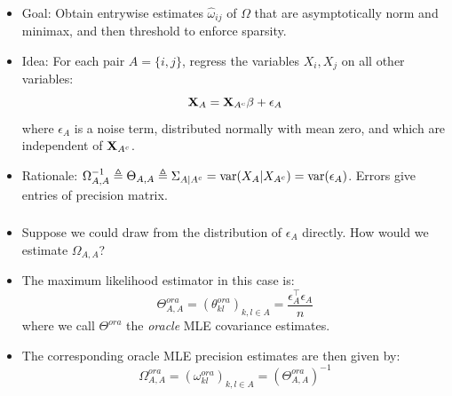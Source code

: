 \begin{frame}[fragile] \frametitle{}
    \begin{itemize}
        \item Goal: Obtain entrywise estimates $\hat\omega_{ij}$ of $\Omega$
            that are asymptotically norm and minimax, and then threshold to
            enforce sparsity.
        \item Idea: For each pair $A = \{i, j\}$, regress the variables $X_i,
            X_j$ on all other variables:
            $$
            \mathbf{X}_A = \mathbf{X}_{A^c}\beta + \epsilon_A
            $$
            where $\epsilon_A$ is a noise term, distributed normally with mean
            zero, and which are independent of $\mathbf{X}_{A^c}$.
        \item Rationale: $\Omega_{A, A}^{-1} \triangleq \Theta_{A, A} \triangleq
            \Sigma_{A|A^c} = \operatorname{\mathrm{var}}(X_A|X_{A^c}) = \operatorname{\mathrm{var}}(\epsilon_A)$.  Errors
            give entries of precision matrix.
    \end{itemize}
\end{frame}
\begin{frame}[fragile] \frametitle{}

    \begin{itemize}
        \item Suppose we could draw from the distribution of $\epsilon_A$
            directly.  How would we estimate $\Omega_{A, A}$?  
        \item The maximum likelihood estimator in this case is:
            $$
            \Theta^{ora}_{A, A} = (\theta^{ora}_{kl})_{k, l \in A}
            = \frac{\epsilon_A^\top\epsilon_A}{n}
            $$
            where we call $\Theta^{ora}$ the \textit{oracle} MLE covariance estimates.
        \item The corresponding oracle MLE precision estimates are then given
            by:
            $$
            \Omega^{ora}_{A, A} = (\omega^{ora}_{kl})_{k, l \in A}
                = \left(\Theta^{ora}_{A, A}\right)^{-1}
            $$
    \end{itemize}
\end{frame}

